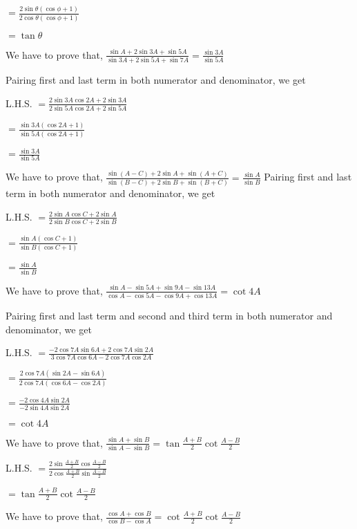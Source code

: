   $= \frac{2\sin\theta(\cos\phi + 1)}{2\cos\theta(\cos\phi + 1)}$

  $= \tan\theta$

\item We have to prove that, $\frac{\sin A + 2\sin 3A + \sin 5A}{\sin 3A + 2\sin 5A + \sin 7A} = \frac{\sin 3A}{\sin 5A}$

  Pairing first and last term in both numerator and denominator, we get

  L.H.S. $= \frac{2\sin3A\cos2A + 2\sin3A}{2\sin5A\cos2A + 2\sin5A}$

  $= \frac{\sin3A(\cos 2A + 1)}{\sin5A(\cos 2A + 1)}$

  $= \frac{\sin 3A}{\sin 5A}$

\item We have to prove that, $\frac{\sin(A - C) + 2\sin A + \sin(A + C)}{\sin (B - C) + 2\sin B + \sin(B + C)} = \frac{\sin
  A}{\sin B}$
  Pairing first and last term in both numerator and denominator, we get

  L.H.S. $= \frac{2\sin A\cos C + 2\sin A}{2\sin B\cos C + 2\sin B}$

  $= \frac{\sin A(\cos C + 1)}{\sin B(\cos C + 1)}$

  $= \frac{\sin A}{\sin B}$

\item We have to prove that, $\frac{\sin A - \sin 5A + \sin 9A - \sin 13A}{\cos A - \cos 5A - \cos 9A + \cos 13 A} = \cot 4A$

  Pairing first and last term and second and third term in both numerator and denominator, we get

  L.H.S. $= \frac{-2\cos7A\sin6A + 2\cos7A\sin 2A}{3\cos7A\cos6A - 2\cos7A\cos2A}$

  $= \frac{2\cos7A(\sin 2A - \sin 6A)}{2\cos 7A(\cos 6A - \cos 2A)}$

  $= \frac{-2\cos 4A\sin 2A}{-2\sin 4A\sin 2A}$

  $= \cot 4A$

\item We have to prove that, $\frac{\sin A + \sin B}{\sin A - \sin B} = \tan \frac{A + B}{2}\cot \frac{A - B}{2}$

  L.H.S. $= \frac{2\sin\frac{A + B}{2}\cos\frac{A - B }{2}}{2\cos\frac{A + B}{2}\sin\frac{A - B}{2}}$

  $= \tan \frac{A + B}{2}\cot \frac{A - B}{2}$

\item We have to prove that, $\frac{\cos A + \cos B}{\cos B - \cos A} = \cot \frac{A + B}{2}\cot \frac{A - B}{2}$

